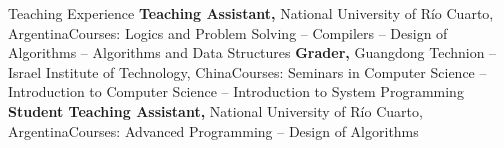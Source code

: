 \begin{rubric}{Teaching Experience}
\entry*[2024 -- Jun. 2026]
	\textbf{Teaching Assistant,} National University of Río Cuarto, Argentina\newline Courses: Logics and Problem Solving -- Compilers -- Design of Algorithms -- Algorithms and Data Structures
\entry*[2023 -- 2025]
	\textbf{Grader, } Guangdong Technion – Israel Institute of Technology, China\newline Courses: Seminars in Computer Science -- Introduction to Computer Science -- Introduction to System Programming
\entry*[2022 -- 2024]
	\textbf{Student Teaching Assistant, } National University of Río Cuarto, Argentina\newline Courses: Advanced Programming -- Design of Algorithms
\end{rubric}